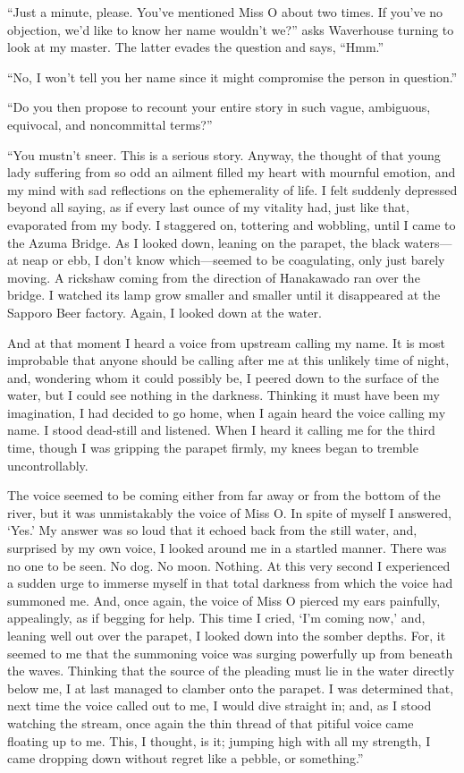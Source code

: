 \documentclass[12pt, openright]{book}
\begin{document}
``Just a minute, please. You've mentioned Miss O about two times. If
you've no objection, we'd like to know her name wouldn't we?'' asks
Waverhouse turning to look at my master. The latter evades the question
and says, ``Hmm.''

``No, I won't tell you her name since it might compromise the person in
question.''

``Do you then propose to recount your entire story in such vague,
ambiguous, equivocal, and noncommittal terms?''

``You mustn't sneer. This is a serious story. Anyway, the thought of
that young lady suffering from so odd an ailment filled my heart with
mournful emotion, and my mind with sad reflections on the ephemerality
of life. I felt suddenly depressed beyond all saying, as if every last
ounce of my vitality had, just like that, evaporated from my body. I
staggered on, tottering and wobbling, until I came to the Azuma Bridge.
As I looked down, leaning on the parapet, the black waters---at neap or
ebb, I don't know which---seemed to be coagulating, only just barely
moving. A rickshaw coming from the direction of Hanakawado ran over the
bridge. I watched its lamp grow smaller and smaller until it disappeared
at the Sapporo Beer factory. Again, I looked down at the water.

And at that moment I heard a voice from upstream calling my name. It is
most improbable that anyone should be calling after me at this unlikely
time of night, and, wondering whom it could possibly be, I peered down
to the surface of the water, but I could see nothing in the darkness.
Thinking it must have been my imagination, I had decided to go home,
when I again heard the voice calling my name. I stood dead-still and
listened. When I heard it calling me for the third time, though I was
gripping the parapet firmly, my knees began to tremble uncontrollably.

The voice seemed to be coming either from far away or from the bottom of
the river, but it was unmistakably the voice of Miss O. In spite of
myself I answered, `Yes.' My answer was so loud that it echoed back from
the still water, and, surprised by my own voice, I looked around me in a
startled manner. There was no one to be seen. No dog. No moon. Nothing.
At this very second I experienced a sudden urge to immerse myself in
that total darkness from which the voice had summoned me. And, once
again, the voice of Miss O pierced my ears painfully, appealingly, as if
begging for help. This time I cried, `I'm coming now,' and, leaning well
out over the parapet, I looked down into the somber depths. For, it
seemed to me that the summoning voice was surging powerfully up from
beneath the waves. Thinking that the source of the pleading must lie in
the water directly below me, I at last managed to clamber onto the
parapet. I was determined that, next time the voice called out to me, I
would dive straight in; and, as I stood watching the stream, once again
the thin thread of that pitiful voice came floating up to me. This, I
thought, is it; jumping high with all my strength, I came dropping down
without regret like a pebble, or something.''
\end{document}
